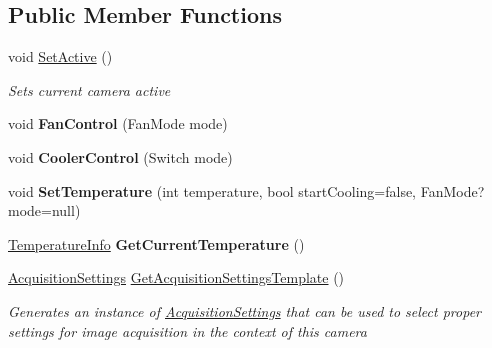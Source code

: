 \subsection*{Public Member Functions}
\begin{DoxyCompactItemize}
\item 
void \hyperlink{class_a_n_d_o_r___c_s_1_1_classes_1_1_camera_a262734b24f4651701e2a52df3b683d75}{Set\+Active} ()
\begin{DoxyCompactList}\small\item\em Sets current camera active \end{DoxyCompactList}\item 
\mbox{\label{class_a_n_d_o_r___c_s_1_1_classes_1_1_camera_ab676be5d4ebf3e2bdc3e5182007f701a}} 
void {\bfseries Fan\+Control} (Fan\+Mode mode)
\item 
\mbox{\label{class_a_n_d_o_r___c_s_1_1_classes_1_1_camera_a01241907dc1767980d03d56acbd4aef9}} 
void {\bfseries Cooler\+Control} (Switch mode)
\item 
\mbox{\label{class_a_n_d_o_r___c_s_1_1_classes_1_1_camera_a7e30eda1638918d5b8be849a1584f5d1}} 
void {\bfseries Set\+Temperature} (int temperature, bool start\+Cooling=false, Fan\+Mode? mode=null)
\item 
\mbox{\label{class_a_n_d_o_r___c_s_1_1_classes_1_1_camera_a146f02101fcdf05e5076ca2852b930e8}} 
\hyperlink{struct_a_n_d_o_r___c_s_1_1_data_structures_1_1_temperature_info}{Temperature\+Info} {\bfseries Get\+Current\+Temperature} ()
\item 
\hyperlink{class_a_n_d_o_r___c_s_1_1_classes_1_1_acquisition_settings}{Acquisition\+Settings} \hyperlink{class_a_n_d_o_r___c_s_1_1_classes_1_1_camera_a678cf1352506a482a68e9285b2f589ec}{Get\+Acquisition\+Settings\+Template} ()
\begin{DoxyCompactList}\small\item\em Generates an instance of \hyperlink{class_a_n_d_o_r___c_s_1_1_classes_1_1_acquisition_settings}{Acquisition\+Settings} that can be used to select proper settings for image acquisition in the context of this camera \end{DoxyCompactList}\item 

\end{DoxyCompactItemize}

